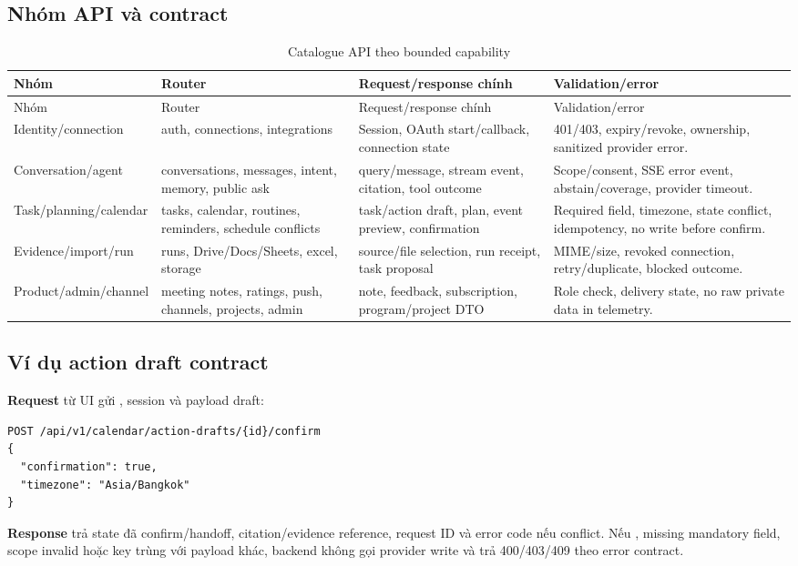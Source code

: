 \documentclass[12pt,a4paper]{article}
\begin{document}
\subsection{Nhóm API và contract}
\begin{longtable}{p{3.4cm}p{3.2cm}p{4.1cm}p{3.5cm}}
\caption{Catalogue API theo bounded capability}\label{tab:sdd-api-catalogue}\\
\toprule Nhóm & Router & Request/response chính & Validation/error \\ \midrule
\endfirsthead
\toprule Nhóm & Router & Request/response chính & Validation/error \\ \midrule
\endhead
Identity/connection & auth, connections, integrations & Session, OAuth start/callback, connection state & 401/403, expiry/revoke, ownership, sanitized provider error. \\
Conversation/agent & conversations, messages, intent, memory, public ask & query/message, stream event, citation, tool outcome & Scope/consent, SSE error event, abstain/coverage, provider timeout. \\
Task/planning/calendar & tasks, calendar, routines, reminders, schedule conflicts & task/action draft, plan, event preview, confirmation & Required field, timezone, state conflict, idempotency, no write before confirm. \\
Evidence/import/run & runs, Drive/Docs/Sheets, excel, storage & source/file selection, run receipt, task proposal & MIME/size, revoked connection, retry/duplicate, blocked outcome. \\
Product/admin/channel & meeting notes, ratings, push, channels, projects, admin & note, feedback, subscription, program/project DTO & Role check, delivery state, no raw private data in telemetry. \\
\bottomrule
\end{longtable}

\subsection{Ví dụ action draft contract}
\textbf{Request} từ UI gửi , session và payload draft:
\begin{verbatim}
POST /api/v1/calendar/action-drafts/{id}/confirm
{
  "confirmation": true,
  "timezone": "Asia/Bangkok"
}
\end{verbatim}
\textbf{Response} trả state đã confirm/handoff, citation/evidence reference,
request ID và error code nếu conflict. Nếu , missing
mandatory field, scope invalid hoặc key trùng với payload khác, backend không gọi
provider write và trả 400/403/409 theo error contract.
\end{document}
